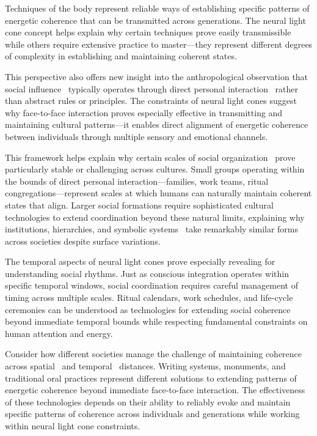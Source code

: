 Techniques of the body represent reliable ways of establishing specific patterns of energetic coherence that can be transmitted across generations. The neural light cone concept helps explain why certain techniques prove easily transmissible while others require extensive practice to master—they represent different degrees of complexity in establishing and maintaining coherent states.

This perspective also offers new insight into the anthropological observation that social influence~ typically operates through direct personal interaction~ rather than abstract rules or principles. The constraints of neural light cones suggest why face-to-face interaction proves especially effective in transmitting and maintaining cultural patterns—it enables direct alignment of energetic coherence between individuals through multiple sensory and emotional channels.

This framework helps explain why certain scales of social organization~ prove particularly stable or challenging across cultures. Small groups operating within the bounds of direct personal interaction—families, work teams, ritual congregations—represent scales at which humans can naturally maintain coherent states that align. Larger social formations require sophisticated cultural technologies to extend coordination beyond these natural limits, explaining why institutions, hierarchies, and symbolic systems~ take remarkably similar forms across societies despite surface variations.

The temporal aspects of neural light cones prove especially revealing for understanding social rhythms. Just as conscious integration operates within specific temporal windows, social coordination requires careful management of timing across multiple scales. Ritual calendars, work schedules, and life-cycle ceremonies can be understood as technologies for extending social coherence beyond immediate temporal bounds while respecting fundamental constraints on human attention and energy.

Consider how different societies manage the challenge of maintaining coherence across spatial~ and temporal~ distances. Writing systems, monuments, and traditional oral practices represent different solutions to extending patterns of energetic coherence beyond immediate face-to-face interaction. The effectiveness of these technologies depends on their ability to reliably evoke and maintain specific patterns of coherence across individuals and generations while working within neural light cone constraints.

